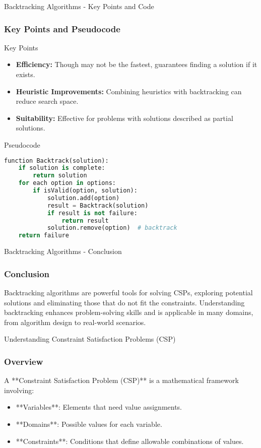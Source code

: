 \documentclass[aspectratio=169]{beamer}
\begin{document}
\begin{frame}[fragile]{Backtracking Algorithms - Key Points and Code}
    \frametitle{Key Points and Pseudocode}
    \begin{block}{Key Points}
        \begin{itemize}
            \item \textbf{Efficiency:} Though may not be the fastest, guarantees finding a solution if it exists.
            \item \textbf{Heuristic Improvements:} Combining heuristics with backtracking can reduce search space.
            \item \textbf{Suitability:} Effective for problems with solutions described as partial solutions.
        \end{itemize}
    \end{block}
    
    \begin{block}{Pseudocode}
    \begin{lstlisting}[language=Python]
function Backtrack(solution):
    if solution is complete:
        return solution
    for each option in options:
        if isValid(option, solution):
            solution.add(option)
            result = Backtrack(solution)
            if result is not failure:
                return result
            solution.remove(option)  # backtrack
    return failure
    \end{lstlisting}
    \end{block}
\end{frame}

\begin{frame}[fragile]{Backtracking Algorithms - Conclusion}
    \frametitle{Conclusion}
    Backtracking algorithms are powerful tools for solving CSPs, exploring potential solutions and eliminating those that do not fit the constraints. Understanding backtracking enhances problem-solving skills and is applicable in many domains, from algorithm design to real-world scenarios.
\end{frame}

\begin{frame}[fragile]{Understanding Constraint Satisfaction Problems (CSP)}
    \frametitle{Overview}
    A **Constraint Satisfaction Problem (CSP)** is a mathematical framework involving:
    \begin{itemize}
        \item **Variables**: Elements that need value assignments.
        \item **Domains**: Possible values for each variable.
        \item **Constraints**: Conditions that define allowable combinations of values.
    \end{itemize}
\end{frame}
\end{document}
